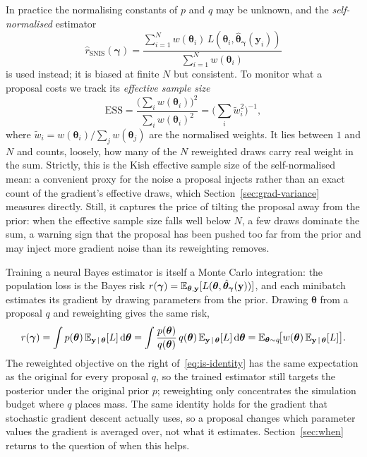 In practice the normalising constants of $p$ and $q$ may be unknown, and
the \emph{self-normalised} estimator
%
\begin{equation}
  \hat{r}_{\text{SNIS}}(\bm{\gamma})
  = \frac{\sum_{i=1}^{N} w(\bm{\theta}_i)\,
          L(\bm{\theta}_i, \hat{\bm{\theta}}_{\bm{\gamma}}(\mathbf{y}_i))}
         {\sum_{i=1}^{N} w(\bm{\theta}_i)}
  \label{eq:snis}
\end{equation}
%
is used instead; it is biased at finite $N$ but consistent. To monitor
what a proposal costs we track its \emph{effective sample size}
%
\begin{equation}
  \mathrm{ESS}
  = \frac{\big(\sum_i w(\bm{\theta}_i)\big)^2}{\sum_i w(\bm{\theta}_i)^2}
  = \Big(\textstyle\sum_i \tilde{w}_i^2\Big)^{-1},
  \label{eq:ess}
\end{equation}
%
where $\tilde{w}_i = w(\bm{\theta}_i)/\sum_j w(\bm{\theta}_j)$ are the
normalised weights. It lies between $1$ and $N$ and counts, loosely, how
many of the $N$ reweighted draws carry real weight in the sum. Strictly,
this is the Kish effective sample size of the self-normalised mean: a
convenient proxy for the noise a proposal injects rather than an exact
count of the gradient's effective draws, which
Section~\ref{sec:grad-variance} measures directly. Still, it captures
the price of tilting the proposal away from the prior: when the
effective sample size falls well below $N$, a few draws dominate the
sum, a warning sign that the proposal has been pushed too far from the
prior and may inject more gradient noise than its reweighting removes.

Training a neural Bayes estimator is itself a Monte Carlo integration:
the population loss is the Bayes risk
$r(\bm{\gamma}) = \mathbb{E}_{\bm{\theta}, \mathbf{y}}
[L(\bm{\theta}, \hat{\bm{\theta}}_{\bm{\gamma}}(\mathbf{y}))]$, and each
minibatch estimates its gradient by drawing parameters from the prior.
Drawing $\bm{\theta}$ from a proposal $q$ and reweighting gives the same
risk,
%
\begin{equation}
  r(\bm{\gamma})
  = \int p(\bm{\theta})\,
      \mathbb{E}_{\mathbf{y} \,|\, \bm{\theta}}[L]\,\mathrm{d}\bm{\theta}
  = \int \frac{p(\bm{\theta})}{q(\bm{\theta})}\, q(\bm{\theta})\,
      \mathbb{E}_{\mathbf{y} \,|\, \bm{\theta}}[L]\,\mathrm{d}\bm{\theta}
  = \mathbb{E}_{\bm{\theta} \sim q}\!\big[w(\bm{\theta})\,
      \mathbb{E}_{\mathbf{y} \,|\, \bm{\theta}}[L]\big].
  \label{eq:is-identity}
\end{equation}
%
The reweighted objective on the right of~\eqref{eq:is-identity} has the
same expectation as the original for every proposal $q$, so the trained
estimator still targets the posterior under the original prior $p$;
reweighting only concentrates the simulation budget where $q$ places
mass. The same identity holds for the gradient that stochastic gradient
descent actually uses, so a proposal changes which parameter values the
gradient is averaged over, not what it estimates.
Section~\ref{sec:when} returns to the question of when this helps.

